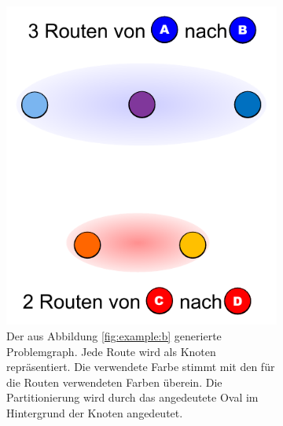 \begin{figure}
	\centering
	\begin{subfigure}[t]{0.3\textwidth}
		\includegraphics[width=\textwidth]{img/bsp3}
		\caption{Der aus Abbildung \ref{fig:example:b} generierte Problemgraph. Jede Route wird als Knoten repräsentiert. Die verwendete Farbe stimmt mit den
		für die Routen verwendeten Farben überein. Die Partitionierung wird durch das angedeutete Oval im Hintergrund der Knoten angedeutet.}
		\label{fig:example:c}
	\end{subfigure}
	\begin{subfigure}[t]{0.3\textwidth}

\end{subfigure}
\end{figure}
